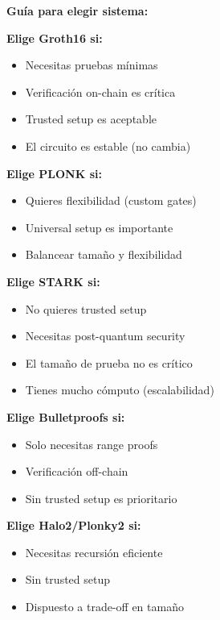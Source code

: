 \documentclass[11pt,a4paper,twoside,openright]{book}
\theoremstyle{definition}
\theoremstyle{plain}
\theoremstyle{remark}
\begin{document}
\begin{keyidea}
\textbf{Guía para elegir sistema:}

\textbf{Elige Groth16 si:}
\begin{itemize}
    \item Necesitas pruebas mínimas
    \item Verificación on-chain es crítica
    \item Trusted setup es aceptable
    \item El circuito es estable (no cambia)
\end{itemize}

\textbf{Elige PLONK si:}
\begin{itemize}
    \item Quieres flexibilidad (custom gates)
    \item Universal setup es importante
    \item Balancear tamaño y flexibilidad
\end{itemize}

\textbf{Elige STARK si:}
\begin{itemize}
    \item No quieres trusted setup
    \item Necesitas post-quantum security
    \item El tamaño de prueba no es crítico
    \item Tienes mucho cómputo (escalabilidad)
\end{itemize}

\textbf{Elige Bulletproofs si:}
\begin{itemize}
    \item Solo necesitas range proofs
    \item Verificación off-chain
    \item Sin trusted setup es prioritario
\end{itemize}

\textbf{Elige Halo2/Plonky2 si:}
\begin{itemize}
    \item Necesitas recursión eficiente
    \item Sin trusted setup
    \item Dispuesto a trade-off en tamaño
\end{itemize}
\end{keyidea}
\end{document}
